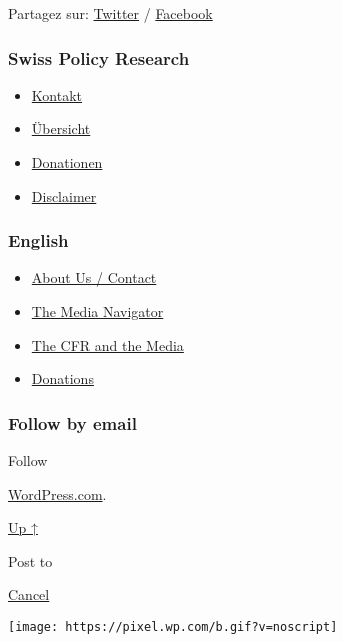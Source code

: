 Partagez sur:
\href{https://twitter.com/intent/tweet?url=https://swprs.org/coronavirus-un-medecin-suisse-parle/}{Twitter}
/
\href{https://www.facebook.com/share.php?u=https://swprs.org/coronavirus-un-medecin-suisse-parle/}{Facebook}

\hypertarget{swiss-policy-research}{%
\subsubsection{Swiss Policy Research}\label{swiss-policy-research}}

\begin{itemize}
\tightlist
\item
  \href{https://swprs.org/kontakt/}{Kontakt}
\item
  \href{https://swprs.org/uebersicht/}{Übersicht}
\item
  \href{https://swprs.org/donationen/}{Donationen}
\item
  \href{https://swprs.org/disclaimer/}{Disclaimer}
\end{itemize}

\hypertarget{english}{%
\subsubsection{English}\label{english}}

\begin{itemize}
\tightlist
\item
  \href{https://swprs.org/contact/}{About Us / Contact}
\item
  \href{https://swprs.org/media-navigator/}{The Media Navigator}
\item
  \href{https://swprs.org/the-american-empire-and-its-media/}{The CFR
  and the Media}
\item
  \href{https://swprs.org/donations/}{Donations}
\end{itemize}

\hypertarget{follow-by-email}{%
\subsubsection{Follow by email}\label{follow-by-email}}

Follow

\href{https://wordpress.com/?ref=footer_custom_com}{WordPress.com}.

\protect\hyperlink{}{Up ↑}

Post to

\protect\hyperlink{}{Cancel}

\texttt{[image: https://pixel.wp.com/b.gif?v=noscript]}

